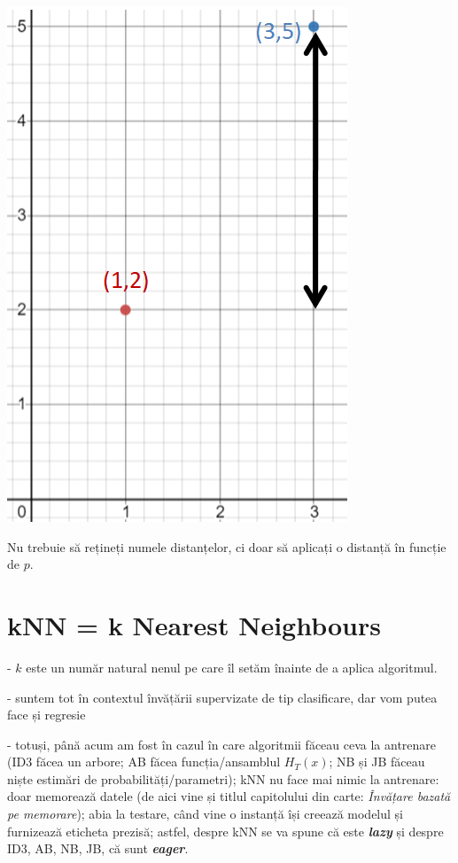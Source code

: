 \documentclass[12pt]{article}
\begin{document}
	\begin{center}
		\includegraphics{screenshot003}
	\end{center}
	
	
	Nu trebuie să rețineți numele distanțelor, ci doar să aplicați o distanță în funcție de $p$.
	
	\section{kNN = k Nearest Neighbours}
	
	 - $k$ este un număr natural nenul pe care îl setăm înainte de a aplica algoritmul.
	
	- suntem tot în contextul învățării supervizate de tip clasificare, dar vom putea face și regresie
	
	- totuși, până acum am fost în cazul în care algoritmii făceau ceva la antrenare (ID3 făcea un arbore; AB făcea funcția/ansamblul $H_T(x)$; NB și JB făceau niște estimări de probabilități/parametri); kNN nu face mai nimic la antrenare: doar memorează datele (de aici vine și titlul capitolului din carte: \textit{Învățare bazată pe memorare}); abia la testare, când vine o instanță își creează modelul și furnizează eticheta prezisă; astfel, despre kNN se va spune că este \textbf{\textit{lazy}} și despre ID3, AB, NB, JB, că sunt \textbf{\textit{eager}}.
	
\end{document}
